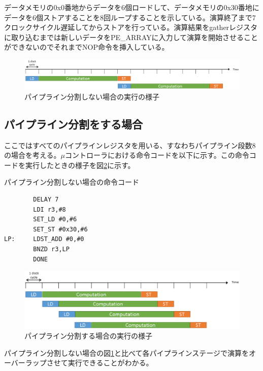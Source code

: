{データメモリの0x0番地からデータを6個ロードして、データメモリの0x30番地にデータを6個ストアすることを8回ループすることを示している。演算終了まで7クロックサイクル遅延してからストアを行っている。演算結果をgatherレジスタに取り込むまでは新しいデータをPE\_ARRAYに入力して演算を開始させることができないのでそれまでNOP命令を挿入している。

\begin{figure}[h]
\centering
\includegraphics[width=12cm]{./chap4/fig/not_pipelined_look.eps}
\caption{パイプライン分割しない場合の実行の様子}
\label{fig:not_pipelined_look}
\end{figure}

\subsection{パイプライン分割をする場合}
\label{subsec:pipeline}
ここではすべてのパイプラインレジスタを用いる、すなわちパイプライン段数8の場合を考える。$\mu$コントローラにおける命令コードを以下に示す。この命令コードを実行したときの様子を図\ref{fig:pipelined_look}に示す。
\begin{itembox}[l]{パイプライン分割しない場合の命令コード}
\begin{verbatim}
        DELAY 7
        LDI r3,#8
        SET_LD #0,#6
        SET_ST #0x30,#6
LP:     LDST_ADD #0,#0
        BNZD r3,LP
        DONE
\end{verbatim}
\end{itembox}

\begin{figure}[h]
\centering
\includegraphics[width=12cm]{./chap4/fig/pipelined_look.eps}
\caption{パイプライン分割する場合の実行の様子}
\label{fig:pipelined_look}
\end{figure}

パイプライン分割しない場合の図\ref{fig:not_pipelined_look}と比べて各パイプラインステージで演算をオーバーラップさせて実行できることがわかる。

}
